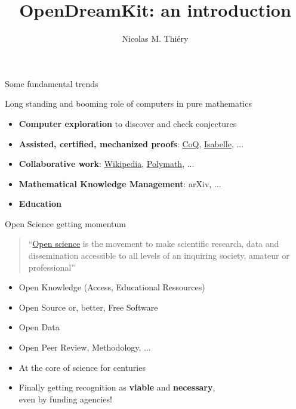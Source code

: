 \documentclass{beamer}
\author{Nicolas M. Thiéry}
\title{OpenDreamKit: an introduction}
\begin{document}
\begin{frame}
  \titlepage

\end{frame}

\begin{frame}{Some fundamental trends}\label{some-fundamental-trends}
\end{frame}

\begin{frame}{Long standing and booming role of computers in pure
    mathematics}
  \label{long-standing-and-booming-role-of-computers-in-pure-mathematics}


  \begin{itemize}
  \item \textbf{Computer exploration} to discover and check conjectures
  \item \textbf{Assisted, certified, mechanized proofs}: \href{https://coq.inria.fr/}{CoQ}, \href{https://isabelle.in.tum.de/}{Isabelle}, ...
  \item \textbf{Collaborative work}:
    \href{https://www.wikipedia.org/}{Wikipedia},
    \href{https://polymathprojects.org/}{Polymath}, ...
  \item \textbf{Mathematical Knowledge Management}: arXiv, ...
  \item \textbf{Education}
  \end{itemize}
\end{frame}

\begin{frame}{Open Science getting momentum}
  \begin{quote}
    ``\href{https://en.wikipedia.org/wiki/Open_science}{Open science}
    is the movement to make scientific research, data and
    dissemination accessible to all levels of an inquiring society,
    amateur or professional''
  \end{quote}

  \begin{itemize}
  \item Open Knowledge (Access, Educational Ressources)
  \item Open Source or, better, Free Software
  \item Open Data
  \item Open Peer Review, Methodology, ...
  \end{itemize}

  \begin{itemize}
  \item At the core of science for centuries
  \item Finally getting recognition as \textbf{viable} and \textbf{necessary},\\
    even by funding agencies!
  \end{itemize}
\end{frame}
\end{document}
